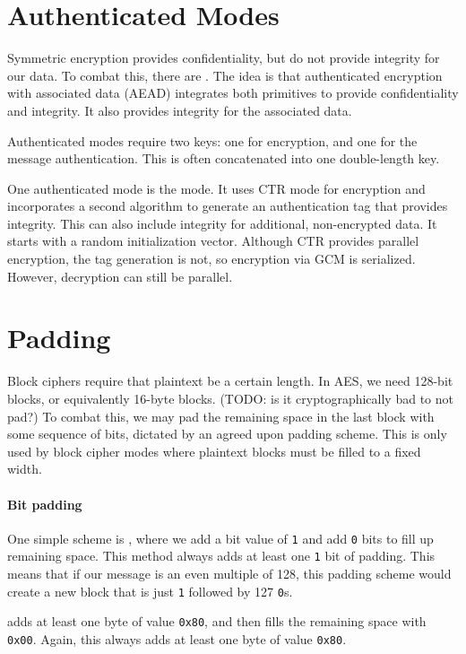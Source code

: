 \section{Authenticated Modes}
Symmetric encryption provides confidentiality, but do not provide integrity for our data. To combat this, there are . The idea is that authenticated encryption with associated data (AEAD) integrates both primitives to provide confidentiality and integrity. It also provides integrity for the associated data.

Authenticated modes require two keys: one for encryption, and one for the message authentication. This is often concatenated into one double-length key.

One authenticated mode is the  mode. It uses CTR mode for encryption and incorporates a second algorithm to generate an authentication tag that provides integrity. This can also include integrity for additional, non-encrypted data. It starts with a random initialization vector. Although CTR provides parallel encryption, the tag generation is not, so encryption via GCM is serialized. However, decryption can still be parallel.

\section{Padding}
Block ciphers require that plaintext be a certain length. In AES, we need 128-bit blocks, or equivalently 16-byte blocks. (TODO: is it cryptographically bad to not pad?) To combat this, we may pad the remaining space in the last block with some sequence of bits, dictated by an agreed upon padding scheme. This is only used by block cipher modes where plaintext blocks must be filled to a fixed width.

\paragraph{Bit padding}
One simple scheme is , where we add a bit value of \texttt{1} and add \texttt{0} bits to fill up remaining space. This method always adds at least one \texttt{1} bit of padding. This means that if our message is an even multiple of 128, this padding scheme would create a new block that is just \texttt{1} followed by 127 \texttt{0}s.

 adds at least one byte of value \texttt{0x80}, and then fills the remaining space with \texttt{0x00}. Again, this always adds at least one byte of value \texttt{0x80}.

